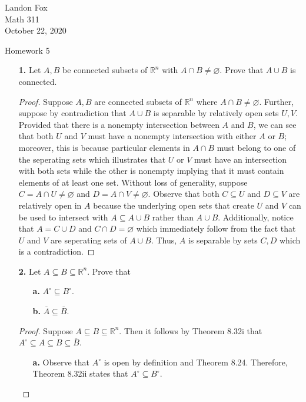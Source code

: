 \documentclass[ 12pt ]{article}
\begin{document}
\noindent Landon Fox \\
\noindent Math 311 \\
\noindent October 22, 2020

\begin{center}
	\Large Homework 5
\end{center}

\begin{enumerate}
	\item[\textbf{1.}] Let $A, B$ be connected subsets of $\mathbb{R}^n$ with $A \cap B \neq \varnothing$. Prove that $A \cup B$ is connected.

		\begin{proof}
			Suppose $A, B$ are connected subsets of $\mathbb{R}^n$ where $A \cap B \neq \varnothing$. Further, suppose by contradiction that $A \cup B$ is separable by relatively
			open sets $U, V$. Provided that there is a nonempty intersection between $A$ and $B$, we can see that both $U$ and $V$ must have a nonempty intersection with either
			$A$ or $B$; moreover, this is because particular elements in $A \cap B$ must belong to one of the seperating sets which illustrates that $U$ or $V$ must have an intersection
			with both sets while the other is nonempty implying that it must contain elements of at least one set. Without loss of generality, suppose $C = A \cap U \neq \varnothing$ and
			$D = A \cap V \neq \varnothing$. Observe that both $C \subseteq U$ and $D \subseteq V$ are relatively open in $A$ because the underlying open sets that create $U$ and $V$ can
			be used to intersect with $A \subseteq A \cup B$ rather than $A \cup B$. Additionally, notice that $A = C \cup D$ and $C \cap D = \varnothing$ which immediately follow from
			the fact that $U$ and $V$ are seperating sets of $A \cup B$. Thus, $A$ is separable by sets $C, D$ which is a contradiction.
		\end{proof}


	\item[\textbf{2.}] Let $A \subseteq B \subseteq \mathbb{R}^n$. Prove that
		\begin{enumerate}
			\item[\textbf{a.}] $A^\circ \subseteq B^\circ$.
			\item[\textbf{b.}] $\overline{A} \subseteq \overline{B}$.
		\end{enumerate}

		\begin{proof}
			Suppose $A \subseteq B \subseteq \mathbb{R}^n$. Then it follows by Theorem 8.32i that $A^\circ \subseteq A \subseteq B \subseteq \overline{B}$.
			\begin{enumerate}
				\item[\textbf{a.}] Observe that $A^\circ$ is open by definition and Theorem 8.24. Therefore, Theorem 8.32ii states that $A^\circ \subseteq B^\circ$.


\end{enumerate}
\end{proof}
\end{enumerate}
\end{document}
